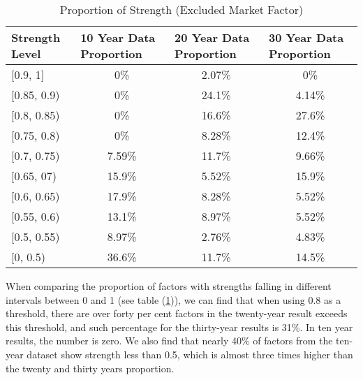 \begin{table}[hbt!]
	\caption{Proportion of Strength (Excluded Market Factor) }\label{table:proportion}
	\begin{tabular}{lccc}
		\hline
		\hline
		Strength Level & \multicolumn{1}{l}{10 Year Data Proportion} & \multicolumn{1}{l}{20 Year Data Proportion} & \multicolumn{1}{l}{30 Year Data Proportion} \\ \hline
		{[}0.9, 1{]}   & 0\%                                         & 2.07\%                                      & 0\%                                         \\
		{[}0.85, 0.9)  & 0\%                                         & 24.1\%                                      & 4.14\%                                      \\
		{[}0.8, 0.85)  & 0\%                                         & 16.6\%                                      & 27.6\%                                      \\
		{[}0.75, 0.8)  & 0\%                                         & 8.28\%                                      & 12.4\%                                      \\
		{[}0.7, 0.75)  & 7.59\%                                      & 11.7\%                                      & 9.66\%                                      \\
		{[}0.65, 07)   & 15.9\%                                      & 5.52\%                                      & 15.9\%                                      \\
		{[}0.6, 0.65)  & 17.9\%                                      & 8.28\%                                      & 5.52\%                                      \\
		{[}0.55, 0.6)  & 13.1\%                                      & 8.97\%                                      & 5.52\%                                      \\
		{[}0.5, 0.55)  & 8.97\%                                      & 2.76\%                                      & 4.83\%                                      \\
		{[}0, 0.5)     & 36.6\%                                      & 11.7\%                                      & 14.5\%                                      \\ \hline\hline
	\end{tabular}
\end{table}

When comparing the proportion of factors with strengths falling in different intervals between 0 and 1 (see table (\ref{table:proportion})), we can find that when using 0.8 as a threshold, there are over forty per cent factors in the twenty-year result exceeds this threshold, and such percentage for the thirty-year results is 31\%.
In ten year results, the number is zero.
We also find that nearly 40\% of factors from the ten-year dataset show strength less than 0.5, which is almost three times higher than the twenty and thirty years proportion.


